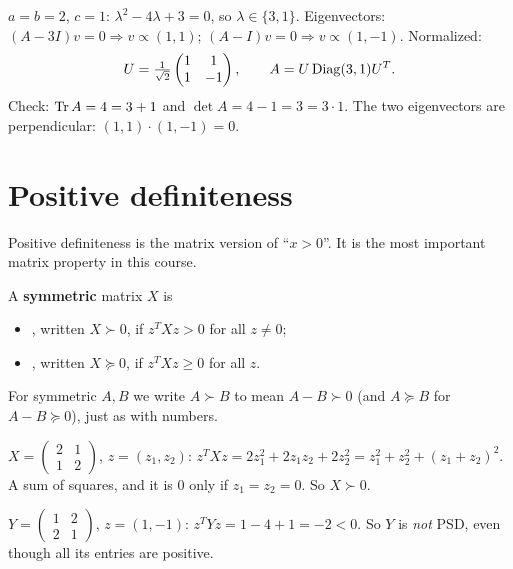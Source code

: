 \begin{example}[$A=\begin{pmatrix}2&1\\1&2\end{pmatrix}$]
$a=b=2$, $c=1$: $\lambda^2-4\lambda+3=0$, so $\lambda\in\{3,1\}$.
Eigenvectors: $(A-3I)v=0\Rightarrow v\propto(1,1)$; $(A-I)v=0\Rightarrow v\propto(1,-1)$. Normalized:
\[ U=\tfrac1{\sqrt2}\begin{pmatrix}1&1\\1&-1\end{pmatrix},\qquad A = U\operatorname{Diag}(3,1)U^T. \]
Check: $\operatorname{Tr} A = 4 = 3+1$ and $\det A = 4-1 = 3 = 3\cdot1$. The two eigenvectors are perpendicular: $(1,1)\cdot(1,-1)=0$.
\end{example}

\section{Positive definiteness}

Positive definiteness is the matrix version of ``$x>0$''. It is the most important matrix property in this course.

\begin{defn}
A \textbf{symmetric} matrix $X$ is
\begin{itemize}
  \item {}, written $X\succ0$, if $z^TXz>0$ for all $z\ne0$;
  \item {}, written $X\succeq0$, if $z^TXz\ge0$ for all $z$.
\end{itemize}
For symmetric $A,B$ we write $A\succ B$ to mean $A-B\succ0$ (and $A\succeq B$ for $A-B\succeq0$), just as with numbers.
\end{defn}

\begin{example}
$X=\begin{pmatrix}2&1\\1&2\end{pmatrix}$, $z=(z_1,z_2)$:
$z^TXz = 2z_1^2+2z_1z_2+2z_2^2 = z_1^2+z_2^2+(z_1+z_2)^2$. A sum of squares, and it is $0$ only if $z_1=z_2=0$. So $X\succ0$.

$Y=\begin{pmatrix}1&2\\2&1\end{pmatrix}$, $z=(1,-1)$: $z^TYz = 1-4+1 = -2<0$. So $Y$ is \emph{not} PSD, even though all its entries are positive.
\end{example}

